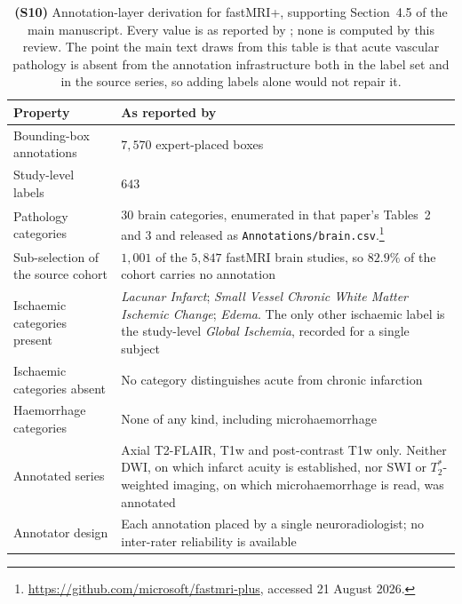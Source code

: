 \documentclass[11pt]{article}
\begin{document}
\clearpage

\begin{table}[t]
\centering
\caption{\textbf{(S10)} Annotation-layer derivation for fastMRI+, supporting
Section~4.5 of the main manuscript. Every value is as reported by
\cite{zhao2022fastmriplus}; none is computed by this review. The point the main text
draws from this table is that acute vascular pathology is absent from the annotation
infrastructure both in the label set and in the source series, so adding labels alone
would not repair it.}
\label{tab:supp_fastmriplus}
\small
\setlength{\tabcolsep}{5pt}
\renewcommand{\arraystretch}{1.2}
\begin{tabular}{>{\raggedright\arraybackslash}p{} >{\raggedright\arraybackslash}p{}}
\hline
\textbf{Property} & \textbf{As reported by \cite{zhao2022fastmriplus}} \\
\hline
Bounding-box annotations & $7{,}570$ expert-placed boxes \\
\hline
Study-level labels & $643$ \\
\hline
Pathology categories & $30$ brain categories, enumerated in that paper's Tables~2 and 3 and released as \texttt{Annotations/brain.csv}.\footnote{\url{https://github.com/microsoft/fastmri-plus}, accessed 21 August 2026.} \\
\hline
Sub-selection of the source cohort & $1{,}001$ of the $5{,}847$ fastMRI brain studies, so $82.9\%$ of the cohort carries no annotation \\
\hline
Ischaemic categories present & \emph{Lacunar Infarct}; \emph{Small Vessel Chronic White Matter Ischemic Change}; \emph{Edema}. The only other ischaemic label is the study-level \emph{Global Ischemia}, recorded for a single subject \\
\hline
Ischaemic categories absent & No category distinguishes acute from chronic infarction \\
\hline
Haemorrhage categories & None of any kind, including microhaemorrhage \\
\hline
Annotated series & Axial T2-FLAIR, T1w and post-contrast T1w only. Neither DWI, on which infarct acuity is established, nor SWI or $T_2^{*}$-weighted imaging, on which microhaemorrhage is read, was annotated \\
\hline
Annotator design & Each annotation placed by a single neuroradiologist; no inter-rater reliability is available \\
\hline
\end{tabular}
\end{table}
\end{document}
